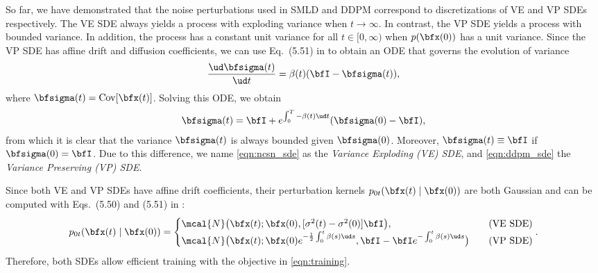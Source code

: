 So far, we have demonstrated that the noise perturbations used in SMLD and DDPM correspond to discretizations of VE and VP SDEs respectively. The VE SDE always yields a process with exploding variance when $t \to \infty$. In contrast, the VP SDE yields a process with bounded variance. In addition, the process has a constant unit variance for all $t \in [0, \infty)$ when $p(\bfx(0))$ has a unit variance. Since the VP SDE has affine drift and diffusion coefficients, we can use Eq.~(5.51) in \citet{sarkka2019applied} to obtain an ODE that governs the evolution of variance
\begin{align*}
    \frac{\ud \bfsigma(t)}{\ud t} = \beta(t) (\bfI - \bfsigma(t)),
\end{align*}
where $\bfsigma(t) = \operatorname{Cov}[\bfx(t)]$. Solving this ODE, we obtain
\begin{align*}
    \bfsigma(t) = \bfI + e^{\int_0^T - \beta(t) \ud t}(\bfsigma(0) - \bfI),
\end{align*}
from which it is clear that the variance $\bfsigma(t)$ is always bounded given $\bfsigma(0)$. Moreover, $\bfsigma(t) \equiv \bfI$ if $\bfsigma(0) = \bfI$. Due to this difference, we name \cref{eqn:ncsn_sde} as the \emph{Variance Exploding (VE) SDE}, and \cref{eqn:ddpm_sde} the \emph{Variance Preserving (VP) SDE}.

Since both VE and VP SDEs have affine drift coefficients, their perturbation kernels $p_{0t}(\bfx(t) \mid \bfx(0))$ are both Gaussian and can be computed with Eqs.~(5.50) and (5.51) in \citet{sarkka2019applied}:
\begin{align}
    p_{0t}(\bfx(t) \mid \bfx(0)) = \begin{cases} 
    \mcal{N}\big(\bfx(t) ; \bfx(0), [\sigma^2(t) - \sigma^2(0)] \bfI\big), &~~~ \text{(VE SDE)}\\
    \mcal{N}\big(\bfx(t) ; \bfx(0)e^{-\frac{1}{2}\int_0^t \beta(s) \ud s}, \bfI - \bfI e^{-\int_0^t \beta(s) \ud s}\big) &~~~ \text{(VP SDE)} 
    \end{cases}.\label{eqn:perturb_kernel}
\end{align}
Therefore, both SDEs allow efficient training with the objective in \cref{eqn:training}.

